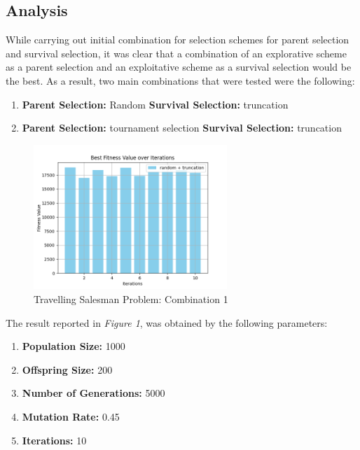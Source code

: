 \documentclass[12pt]{article}
\begin{document}
\subsection{Analysis}

While carrying out initial combination for selection schemes for parent selection and survival selection, it was clear that a combination of an explorative scheme as a parent selection and an exploitative scheme as a survival selection would be the best. As a result, two main combinations that were tested were the following:

    \begin{enumerate}
        \item \textbf{Parent Selection:} Random \textbf{Survival Selection:} truncation
        \item \textbf{Parent Selection:} tournament selection \textbf{Survival Selection:} truncation
    \end{enumerate}


\begin{figure}[h]
    \centering
    \includegraphics[width=0.65\textwidth]{images/figure_1.png}
    \caption{Travelling Salesman Problem: Combination 1}
\end{figure}

The result reported in \textit{Figure 1}, was obtained by the following parameters:

\begin{enumerate}
    \item \textbf{Population Size:} 1000
    \item \textbf{Offspring Size:} 200
    \item \textbf{Number of Generations:} 5000
    \item \textbf{Mutation Rate:} 0.45
    \item \textbf{Iterations:} 10
\end{enumerate}
\end{document}
